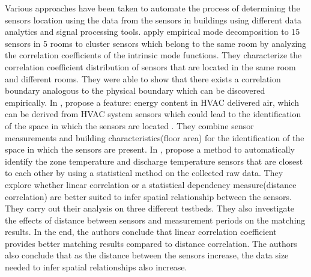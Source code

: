 Various approaches have been taken to automate the process of determining the sensors location using the data from the sensors in buildings using different data analytics and signal processing tools. \citeauthor{Hong:2013:TAS:2528282.2528302}\cite{Hong:2013:TAS:2528282.2528302}
 apply empirical mode decomposition to 15 sensors in 5 rooms to cluster sensors which belong to the same room by analyzing the correlation coefficients of the intrinsic mode functions. They characterize the correlation coefficient distribution of sensors that are located in the
 same room and different rooms. They were able to show that there exists a correlation boundary analogous to the physical boundary which can be discovered empirically. 
In \cite{doi:10.1061/9780784413616.226}, \citeauthor{doi:10.1061/9780784413616.226} propose a feature: energy content in HVAC delivered air, which can be derived from HVAC system sensors which could lead to the identification of the space in which the sensors are located . They combine sensor measurements and building characteristics(floor area) for the identification of the space in which the sensors are present.
In \cite{Koc:2014:CLC:2674061.2674075}, \citeauthor{Koc:2014:CLC:2674061.2674075} propose a method to automatically identify the zone temperature and discharge temperature sensors that are closest to each other by using a statistical method on the collected raw data. They explore whether linear correlation or a statistical dependency measure(distance correlation) are better suited to infer spatial relationship between the sensors. They carry out their analysis on three different testbeds. They also investigate the effects of distance between sensors and measurement periods on the matching results. In the end, the authors conclude that linear correlation coefficient provides better matching results compared to distance correlation. The authors also conclude that as the distance between the sensors increase, the data size needed to infer spatial relationships also increase.

